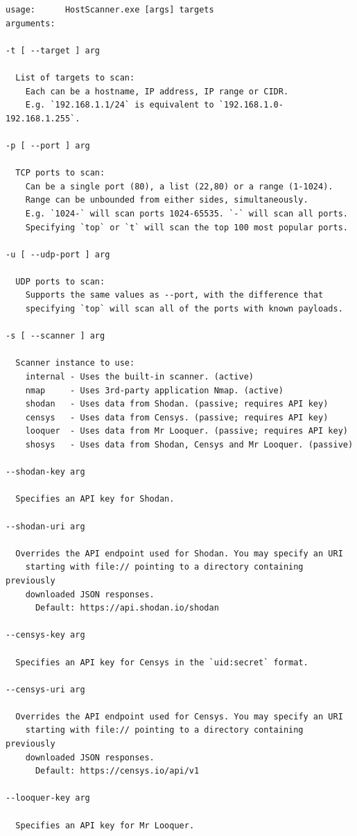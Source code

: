\documentclass[a4paper,12pt]{article}
\begin{document}
	\begin{verbatim}
usage:		HostScanner.exe [args] targets
arguments:

-t [ --target ] arg

  List of targets to scan:
    Each can be a hostname, IP address, IP range or CIDR.
    E.g. `192.168.1.1/24` is equivalent to `192.168.1.0-192.168.1.255`.

-p [ --port ] arg

  TCP ports to scan:
    Can be a single port (80), a list (22,80) or a range (1-1024).
    Range can be unbounded from either sides, simultaneously.
    E.g. `1024-` will scan ports 1024-65535. `-` will scan all ports.
    Specifying `top` or `t` will scan the top 100 most popular ports.

-u [ --udp-port ] arg

  UDP ports to scan:
    Supports the same values as --port, with the difference that
    specifying `top` will scan all of the ports with known payloads.

-s [ --scanner ] arg

  Scanner instance to use:
    internal - Uses the built-in scanner. (active)
    nmap     - Uses 3rd-party application Nmap. (active)
    shodan   - Uses data from Shodan. (passive; requires API key)
    censys   - Uses data from Censys. (passive; requires API key)
    looquer  - Uses data from Mr Looquer. (passive; requires API key)
    shosys   - Uses data from Shodan, Censys and Mr Looquer. (passive)

--shodan-key arg

  Specifies an API key for Shodan.

--shodan-uri arg

  Overrides the API endpoint used for Shodan. You may specify an URI
    starting with file:// pointing to a directory containing previously
    downloaded JSON responses.
      Default: https://api.shodan.io/shodan

--censys-key arg

  Specifies an API key for Censys in the `uid:secret` format.

--censys-uri arg

  Overrides the API endpoint used for Censys. You may specify an URI
    starting with file:// pointing to a directory containing previously
    downloaded JSON responses.
      Default: https://censys.io/api/v1

--looquer-key arg

  Specifies an API key for Mr Looquer.


\end{verbatim}
\end{document}
